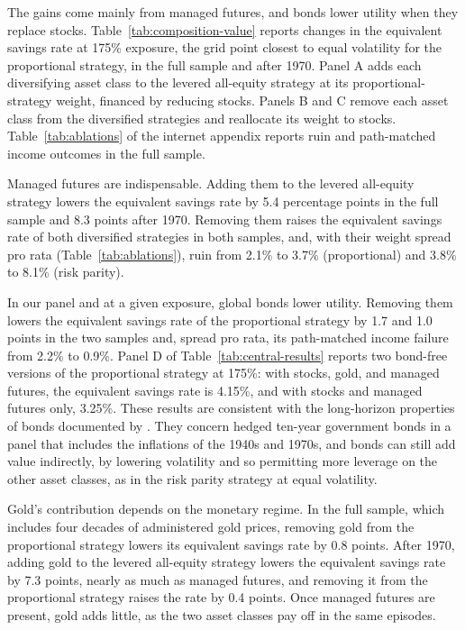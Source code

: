 \documentclass[12pt]{article}
\makeatletter
\newif\ifsubmission
\newcommand{\exhibitlist}{}
\newcommand{\exhibit}[1]{\ifsubmission\g@addto@macro\exhibitlist{}\else\fi}
\makeatother
\begin{document}
The gains come mainly from managed futures, and bonds lower utility when they replace stocks.
Table~\ref{tab:composition-value} reports changes in the equivalent savings rate at 175\% exposure, the
grid point closest to equal volatility for the proportional strategy, in the full sample and after 1970.
Panel A adds each diversifying asset class to the levered all-equity strategy at its proportional-strategy
weight, financed by reducing stocks. Panels B and C remove each asset class from the diversified
strategies and reallocate its weight to stocks. Table~\ref{tab:ablations} of the internet appendix
reports ruin and path-matched income outcomes in the full sample.
\exhibit{figures/erc/composition_value.tex}

Managed futures are indispensable. Adding them to the levered all-equity strategy lowers the equivalent
savings rate by 5.4 percentage points in the full sample and 8.3 points after 1970. Removing them raises the
equivalent savings rate of both diversified strategies in both samples, and, with their weight spread pro
rata (Table~\ref{tab:ablations}), ruin from 2.1\% to 3.7\% (proportional) and 3.8\% to 8.1\% (risk parity).

In our panel and at a given exposure, global bonds lower utility. Removing them lowers the equivalent
savings rate of the proportional strategy by 1.7 and 1.0 points in the two samples and, spread pro rata,
its path-matched income failure from 2.2\% to 0.9\%. Panel D of Table~\ref{tab:central-results} reports two
bond-free versions of the proportional strategy at 175\%: with stocks, gold, and managed futures, the
equivalent savings rate is 4.15\%, and with stocks and managed futures only, 3.25\%. These results are
consistent with the long-horizon properties of bonds documented by \citet{AnarkulovaCederburgODoherty2025}.
They concern hedged ten-year government bonds in a panel that includes the inflations of the 1940s and
1970s, and bonds can still add value indirectly, by lowering volatility and so permitting more leverage on
the other asset classes, as in the risk parity strategy at equal volatility.

Gold's contribution depends on the monetary regime. In the full sample, which includes four decades of
administered gold prices, removing gold from the proportional strategy lowers its equivalent savings rate
by 0.8 points. After 1970, adding gold to the levered all-equity strategy lowers the equivalent savings
rate by 7.3 points, nearly as much as managed futures, and removing it from the proportional strategy
raises the rate by 0.4 points. Once managed futures are present, gold adds little, as the two asset
classes pay off in the same episodes.
\end{document}
